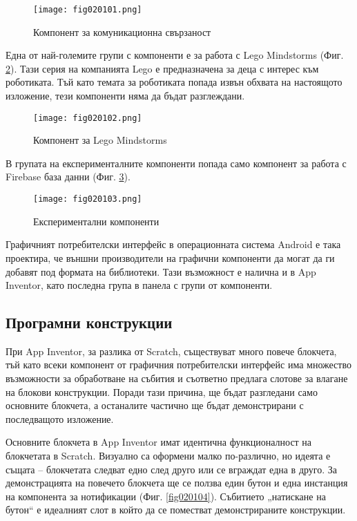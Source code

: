 \begin{figure}[H]
  \centering
  \texttt{[image: fig020101.png]}
  \caption{Компонент за комуникационна свързаност}
\label{fig020101}
\end{figure}

Една от най-големите групи с компоненти е за работа с Lego Mindstorms (Фиг. \ref{fig020102}). Тази серия на компанията Lego е предназначена за деца с интерес към роботиката. Тъй като темата за роботиката попада извън обхвата на настоящото изложение, тези компоненти няма да бъдат разглеждани. 

\begin{figure}[H]
  \centering
  \texttt{[image: fig020102.png]}
  \caption{Компонент за Lego Mindstorms}
\label{fig020102}
\end{figure}

В групата на експерименталните компоненти попада само компонент за работа с Firebase база данни (Фиг. \ref{fig020103}).

\begin{figure}[H]
  \centering
  \texttt{[image: fig020103.png]}
  \caption{Експериментални компоненти}
\label{fig020103}
\end{figure}

Графичният потребителски интерфейс в операционната система Android е така проектира, че външни производители на графични компоненти да могат да ги добавят под формата на библиотеки. Тази възможност е налична и в App Inventor, като последна група в панела с групи от компоненти. 

\subsection{Програмни конструкции}

При App Inventor, за разлика от Scratch, съществуват много повече блокчета, тъй като всеки компонент от графичния потребителски интерфейс има множество възможности за обработване на събития и съответно предлага слотове за влагане на блокови конструкции. Поради тази причина, ще бъдат разгледани само основните блокчета, а останалите частично ще бъдат демонстрирани с последващото изложение. 

Основните блокчета в App Inventor имат идентична функционалност на блокчетата в Scratch. Визуално са оформени малко по-различно, но идеята е същата – блокчетата следват едно след друго или се вграждат една в друго. За демонстрацията на повечето блокчета ще се ползва един бутон и една инстанция на компонента за нотификации (Фиг. \ref{fig020104}). Събитието „натискане на бутон“ е идеалният слот в който да се поместват демонстрираните конструкции. 


